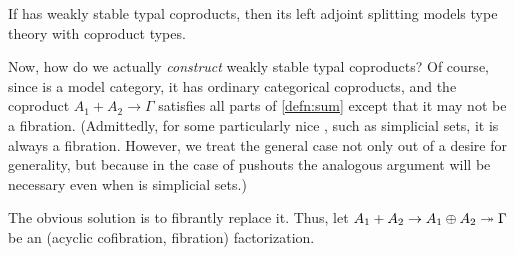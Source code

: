 \begin{thm}
  If \sM has weakly stable typal coproducts, then its left adjoint splitting models type theory with coproduct types.
\end{thm}

Now, how do we actually \emph{construct} weakly stable typal coproducts?
Of course, since \sM is a model category, it has ordinary categorical coproducts, and the coproduct $A_1 + A_2 \to \Gamma$ satisfies all parts of \cref{defn:sum} except that it may not be a fibration.
(Admittedly, for some particularly nice \sM, such as simplicial sets, it is always a fibration.
However, we treat the general case not only out of a desire for generality, but because in the case of pushouts the analogous argument will be necessary even when \sM is simplicial sets.)

The obvious solution is to fibrantly replace it.
Thus, let $A_1 + A_2 \to A_1\oplus A_2 \twoheadrightarrow \Gamma$ be an (acyclic cofibration, fibration) factorization.

